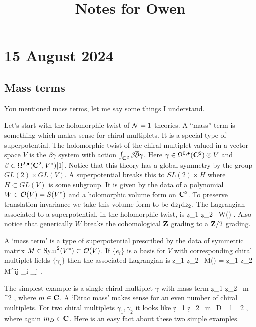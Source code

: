 \documentclass[11pt]{amsart}
\begin{document}
 

\title{Notes for Owen}

\maketitle


\section{15 August 2024}

\subsection{Mass terms}

You mentioned mass terms, let me say some things I understand.

Let's start with the holomorphic twist of $\mathcal N=1$ theories.
A ``mass'' term is something which makes sense for chiral multiplets.
It is a special type of superpotential.
The holomorphic twist of the chiral multiplet valued in a vector space $V$ is the $\beta\gamma$ system with action $\int_{\mathbf{C}^2} \beta \overline{\partial} \gamma$.
Here $\gamma \in \Omega^{0,\bullet}(\mathbf{C}^2) \otimes V$ and $\beta \in \Omega^{2,\bullet}(\mathbf{C}^2, V^*)[1]$.
Notice that this theory has a global symmetry by the group $GL(2) \times GL(V)$.
A superpotential breaks this to $SL(2) \times H$ where $H \subset GL(V)$ is some subgroup.
It is given by the data of a polynomial $W \in \mathcal O(V) = S (V^*)$ and a holomorphic volume form on $\mathbf{C}^2$. To preserve translation invariance we take this volume form to be ${\rm d} z_1 {\rm d} z_2$.
The Lagrangian associated to a superpotential, in the holomorphic twist, is
\beqn
\int \d z_1 \d z_2 \, W(\gamma)  .
\eeqn
Also notice that generically $W$ breaks the cohomological $\mathbf{Z}$ grading to a $\mathbf{Z}/2$ grading.

A `mass term' is a type of superpotential prescribed by the data of symmetric matrix $M \in \operatorname{Sym}^2(V^*) \subset \mathcal O(V)$.
If $\{e_i\}$ is a basis for $V$ with corresponding chiral multiplet fields $\{\gamma_i\}$ then the associated Lagrangian is
\beqn\label{eqn:lagmass}
\int \d z_1 \d z_2 \, M(\gamma) = \int \d z_1 \d z_2 \, M^{ij} \gamma_i \gamma_j .
\eeqn

The simplest example is a single chiral multiplet $\gamma$ with mass term
\beqn\label{eqn:mass1}
 \int \d z_1 \d z_2 \, m \gamma^2 ,
\eeqn
where $m \in \mathbf{C}$.
A `Dirac mass' makes sense for an even number of chiral multiplets.
For two chiral multiplets $\gamma_1, \gamma_2$ it looks like 
\beqn\label{eqn:mass2}
\int \d z_1 \d z_2 \,  m_{D} \gamma_1 \gamma_2 ,
\eeqn
where again $m_D \in \mathbf{C}$.
Here is an easy fact about these two simple examples.
\end{document}
